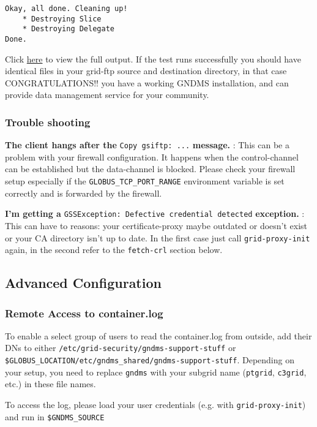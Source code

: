 \documentclass{article}
\begin{document}
\begin{verbatim}
Okay, all done. Cleaning up!
    * Destroying Slice
    * Destroying Delegate
Done.
\end{verbatim}
Click \href{test-output.txt}{here} to view the full output. If the
test runs successfully you should have identical files in your
grid-ftp source and destination directory, in that case
CONGRATULATIONS!! you have a working GNDMS installation, and can
provide data management service for your community.

\subsubsection{Trouble shooting}

\textbf{The client hangs after the }\verb|Copy gsiftp: ...|\textbf{ message.}
: This can be a problem with your firewall configuration. It
happens when the control-channel can be established but the
data-channel is blocked. Please check your firewall setup
especially if the \verb!GLOBUS_TCP_PORT_RANGE! environment variable
is set correctly and is forwarded by the firewall.

\textbf{I'm getting a }\verb|GSSException: Defective credential detected|\textbf{ exception.}
: This can have to reasons: your certificate-proxy maybe outdated
or doesn't exist or your CA directory isn't up to date. In the
first case just call \verb!grid-proxy-init! again, in the second
refer to the \verb!fetch-crl! section below.

\subsection{Advanced Configuration}

\subsubsection{Remote Access to container.log}

To enable a select group of users to read the container.log from
outside, add their DNs to either
\verb!/etc/grid-security/gndms-support-stuff! or
\verb!$GLOBUS_LOCATION/etc/gndms_shared/gndms-support-stuff!.
Depending on your setup, you need to replace \verb!gndms! with your
subgrid name (\verb!ptgrid!, \verb!c3grid!, etc.) in these file
names.

To access the log, please load your user credentials (e.g. with
\verb!grid-proxy-init!) and run in \verb!$GNDMS_SOURCE!
\end{document}
